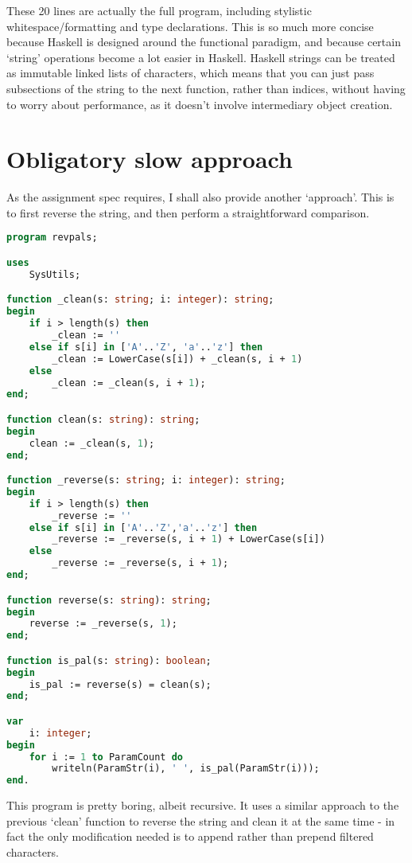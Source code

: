 \documentclass[fleqn,a4paper,11pt]{article}
\begin{document}
\iffalse $ \fi %

    These 20 lines are actually the full program, including stylistic
    whitespace/formatting and type declarations. This is so much more concise
    because Haskell is designed around the functional paradigm, and because
    certain `string' operations become a lot easier in Haskell. Haskell strings
    can be treated as immutable linked lists of characters, which means that you
    can just pass subsections of the string to the next function, rather than
    indices, without having to worry about performance, as it doesn't involve
    intermediary object creation.

    \section{Obligatory slow approach}

    As the assignment spec requires, I shall also provide another `approach'.
    This is to first reverse the string, and then perform a straightforward
    comparison.

\begin{lstlisting}[language=Pascal, caption=Method by string reversal]
program revpals;

uses
    SysUtils;

function _clean(s: string; i: integer): string;
begin
    if i > length(s) then
        _clean := ''
    else if s[i] in ['A'..'Z', 'a'..'z'] then
        _clean := LowerCase(s[i]) + _clean(s, i + 1)
    else
        _clean := _clean(s, i + 1);
end;

function clean(s: string): string;
begin
    clean := _clean(s, 1);
end;

function _reverse(s: string; i: integer): string;
begin
    if i > length(s) then
        _reverse := ''
    else if s[i] in ['A'..'Z','a'..'z'] then
        _reverse := _reverse(s, i + 1) + LowerCase(s[i])
    else
        _reverse := _reverse(s, i + 1);
end;

function reverse(s: string): string;
begin
    reverse := _reverse(s, 1);
end;

function is_pal(s: string): boolean;
begin
    is_pal := reverse(s) = clean(s);
end;

var
    i: integer;
begin
    for i := 1 to ParamCount do
        writeln(ParamStr(i), ' ', is_pal(ParamStr(i)));
end.
\end{lstlisting}

    This program is pretty boring, albeit recursive. It uses a similar approach
    to the previous `clean' function to reverse the string and clean it at the
    same time - in fact the only modification needed is to append rather than
    prepend filtered characters.
\end{document}
